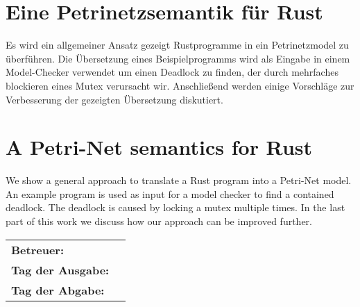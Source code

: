 \section*{Eine Petrinetzsemantik für Rust}
Es wird ein allgemeiner Ansatz gezeigt Rustprogramme in ein Petrinetzmodel zu überführen.
Die Übersetzung eines Beispielprogramms wird als Eingabe in einem Model-Checker verwendet um einen Deadlock zu finden, der durch mehrfaches blockieren eines Mutex verursacht wir.
Anschließend werden einige Vorschläge zur Verbesserung der gezeigten Übersetzung diskutiert.

\section*{A Petri-Net semantics for Rust}
We show a general approach to translate a Rust program into a Petri-Net model.
An example program is used as input for a model checker to find a contained deadlock.
The deadlock is caused by locking a mutex multiple times.
In the last part of this work we discuss how our approach can be improved further.

\vfill

\begin{tabular}{ll}
	\bfseries Betreuer: & \parbox[t]{10cm}{\betreuer }\vspace{5mm} \\
	\bfseries Tag der Ausgabe: &  \\
	\bfseries Tag der Abgabe: &  \\
\end{tabular}
